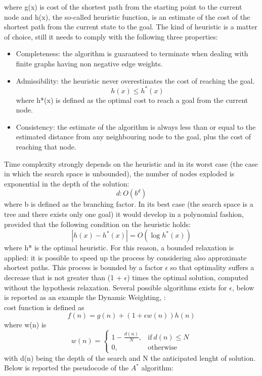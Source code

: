 where g(x) is cost of the shortest path from the starting point to the current node and h(x), the so-called heuristic function, is an estimate of the cost of the shortest path from the current state to the goal.
The kind of heuristic is a matter of choice, still it needs to comply with the following three properties:
\begin{itemize}
    \item Completeness: the algorithm is guaranteed to terminate when dealing with finite graphs having non negative edge weights.
    \item Admissibility: the heuristic never overestimates the cost of reaching the goal. 
    \begin{equation}
        h(x) \le h^*(x)
    \end{equation}
    where h*(x) is defined as the optimal cost to reach a goal from the current node.
    
    \item Consistency: the estimate of the algorithm is always less than or equal to the estimated distance from any neighbouring node to the goal, plus the cost of reaching that node.
\end{itemize}
Time complexity strongly depends on the heuristic and in its worst case (the case in which the search space is unbounded), the number of nodes exploded is exponential in the depth of the solution:
\begin{equation}
    d: O(b^d)
\end{equation}
where b is defined as the branching factor.
In its best case (the search space is a tree and there exists only one goal) it would develop in a polynomial fashion, provided that the following condition on the heuristic holds:
\begin{equation}
    |h(x) - h^*(x)| = O(\log{h^*(x)})
\end{equation}
where h* is the optimal heuristic.
For this reason, a bounded relaxation is applied: it is possible to speed up the process by considering also approximate shortest paths. This process is bounded by a factor $\epsilon$ so that optimality  suffers a decrease that is not greater than (1 + $\epsilon$) times the optimal solution, computed without the hypothesis relaxation.
Several possible algorithms exists for $\epsilon$, below is reported as an example the Dynamic Weighting, \citet{10.5555/1624775.1624777}:\\
cost function is defined as
\begin{equation}
    f(n) = g(n) + (1 + \epsilon w(n))h(n)
\end{equation}
where w(n) is
\begin{equation}
    w(n) = 
    \begin{cases}
1 - \frac{d(n)}{N}, & \text{if}\ d(n) \le N \\
0 , & \text{otherwise}
\end{cases}
\end{equation}
with d(n) being the depth of the search and N the anticipated lenght of solution.
Below is reported the pseudocode of the $A^{*}$ algorithm:

